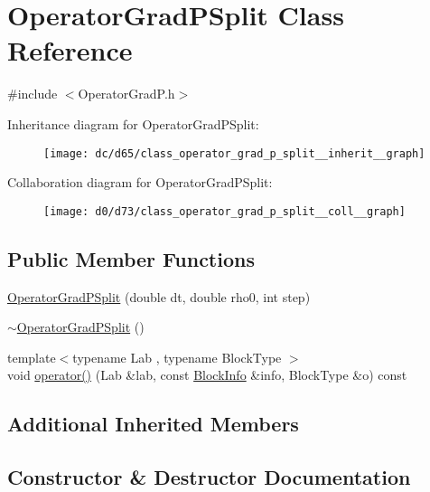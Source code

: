 \hypertarget{class_operator_grad_p_split}{}\section{Operator\+Grad\+P\+Split Class Reference}
\label{class_operator_grad_p_split}


{\ttfamily \#include $<$Operator\+Grad\+P.\+h$>$}



Inheritance diagram for Operator\+Grad\+P\+Split\+:\nopagebreak
\begin{figure}[H]
\begin{center}
\leavevmode
\texttt{[image: dc/d65/class\_operator\_grad\_p\_split\_\_inherit\_\_graph]}
\end{center}
\end{figure}


Collaboration diagram for Operator\+Grad\+P\+Split\+:\nopagebreak
\begin{figure}[H]
\begin{center}
\leavevmode
\texttt{[image: d0/d73/class\_operator\_grad\_p\_split\_\_coll\_\_graph]}
\end{center}
\end{figure}
\subsection*{Public Member Functions}
\begin{DoxyCompactItemize}
\item 
\hyperlink{class_operator_grad_p_split_a8da51bf59061b4f94510f6023be4670b}{Operator\+Grad\+P\+Split} (double dt, double rho0, int step)
\item 
\hyperlink{class_operator_grad_p_split_a746617dce0ec1f07252ae018bfe57adf}{$\sim$\+Operator\+Grad\+P\+Split} ()
\item 
{\footnotesize template$<$typename Lab , typename Block\+Type $>$ }\\void \hyperlink{class_operator_grad_p_split_ad93e7297f5476603c6f86f0c6fcfefac}{operator()} (Lab \&lab, const \hyperlink{struct_block_info}{Block\+Info} \&info, Block\+Type \&o) const 
\end{DoxyCompactItemize}
\subsection*{Additional Inherited Members}


\subsection{Constructor \& Destructor Documentation}
\hypertarget{class_operator_grad_p_split_a8da51bf59061b4f94510f6023be4670b}{}
